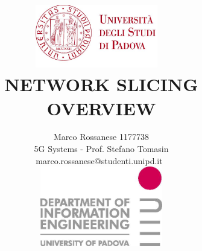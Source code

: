 \documentclass[a4paper,12pt]{report} %
\begin{document}
\clearpage\pagestyle{empty}

\title{
\includegraphics[width=0.4\textwidth]{pics/unipd.jpg}~\\[1.5cm]
NETWORK SLICING OVERVIEW
\\
}

\author{Marco Rossanese 1177738
\\5G Systems - Prof. Stefano Tomasin
\\marco.rossanese@studenti.unipd.it~\\[1cm]\includegraphics[width=0.4\textwidth]{pics/dei.jpg}
}

\maketitle
\newpage


\tableofcontents
\newpage
\printglossaries
\newpage
\end{document}
